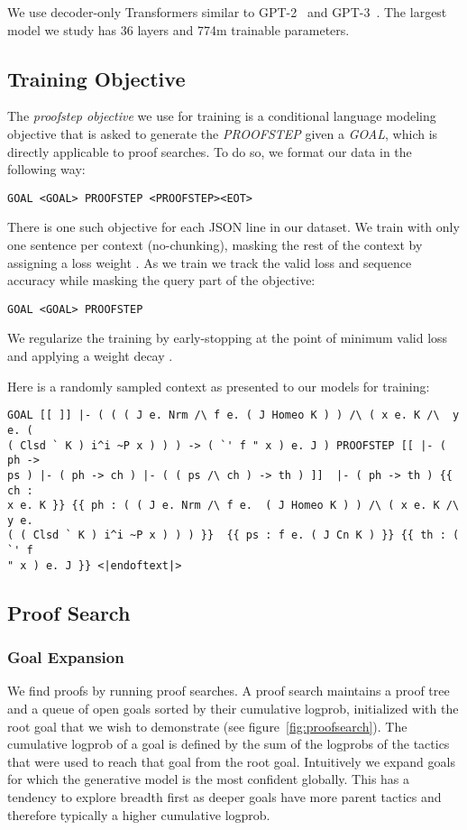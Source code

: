 \documentclass{article}
\begin{document}
We use decoder-only Transformers similar to GPT-2~\cite{radford2019language} and GPT-3~\cite{brown2020language}. The largest model we study has 36 layers and 774m trainable parameters.

\subsection{Training Objective}

The \textit{proofstep objective} we use for training is a conditional language modeling objective that is asked to generate the \textit{PROOFSTEP} given a \textit{GOAL}, which is directly applicable to proof searches. To do so, we format our data in the following way:

\begin{verbatim}
GOAL <GOAL> PROOFSTEP <PROOFSTEP><EOT>
\end{verbatim}

There is one such objective for each JSON line in our dataset. We train with only one sentence per context (no-chunking), masking the rest of the context by assigning a loss weight . As we train we track the valid loss and sequence accuracy while masking the query part of the objective:

\begin{verbatim}
GOAL <GOAL> PROOFSTEP
\end{verbatim}

We regularize the training by early-stopping at the point of minimum valid loss and applying a weight decay .

Here is a randomly sampled context as presented to our models for training:

\begin{verbatim}
GOAL [[ ]] |- ( ( ( J e. Nrm /\ f e. ( J Homeo K ) ) /\ ( x e. K /\  y e. ( 
( Clsd ` K ) i^i ~P x ) ) ) -> ( `' f " x ) e. J ) PROOFSTEP [[ |- ( ph -> 
ps ) |- ( ph -> ch ) |- ( ( ps /\ ch ) -> th ) ]]  |- ( ph -> th ) {{ ch : 
x e. K }} {{ ph : ( ( J e. Nrm /\ f e.  ( J Homeo K ) ) /\ ( x e. K /\ y e. 
( ( Clsd ` K ) i^i ~P x ) ) ) }}  {{ ps : f e. ( J Cn K ) }} {{ th : ( `' f 
" x ) e. J }} <|endoftext|>
\end{verbatim}

\subsection{Proof Search}

\subsubsection{Goal Expansion}
We find proofs by running proof searches. A proof search maintains a proof tree and a queue of open goals sorted by their cumulative logprob, initialized with the root goal that we wish to demonstrate (see figure~\ref{fig:proofsearch}). The cumulative logprob of a goal is defined by the sum of the logprobs of the tactics that were used to reach that goal from the root goal. Intuitively we expand goals for which the generative model is the most confident globally. This has a tendency to explore breadth first as deeper goals have more parent tactics and therefore typically a higher cumulative logprob.
\end{document}
